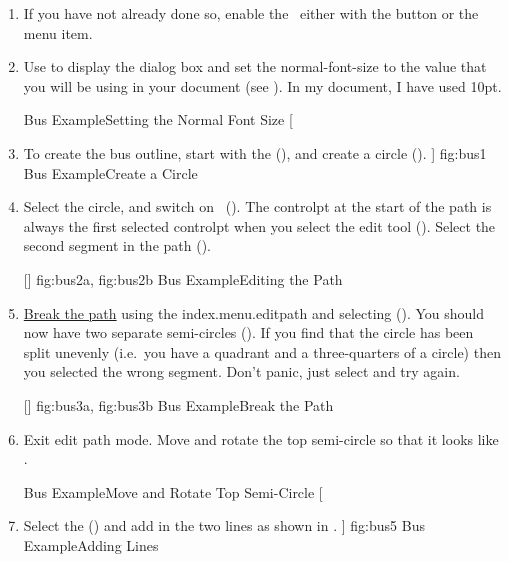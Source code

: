 \begin{enumerate}
\item If you have not already done so, enable the \gridlock\ either
with the  button or the
 menu item.

\item Use  to display the
 dialog box and set the
\gls{normal-font-size} to the value that you will be using in your
document (see ). In my document, I have
used 10pt.

{}
{Bus Example\dash Setting the Normal Font Size}
[
  \item To create the bus outline, start with the
   (), and create a circle
  ().
]
{fig:bus1}
{}
{Bus Example\dash Create a Circle}

\item Select the circle, and switch on \editpathmode\
().  The \gls{controlpt} at the start of
the \gls{path} is always the first selected \gls{controlpt} when you
select the edit tool (\figureref{fig:bus2a}). Select the second
segment in the path ().

[]
{
 {fig:bus2a}{}{},
 {fig:bus2b}{}{}
}
{Bus Example\dash Editing the Path}

\item \hyperref[mi:breakpath]{Break the path} using the
\gls{index.menu.editpath} and selecting 
 ().  You should now have two
separate semi-circles (\figureref{fig:bus3b}).  If you find
that the circle has been split unevenly (i.e.\ you have a quadrant
and a three-quarters of a circle) then you selected the wrong
segment. Don't panic, just select  and try
again.

[]
{
 {fig:bus3a}{}{},
 {fig:bus3b}{}{}
}
{Bus Example\dash Break the Path}

\item Exit edit path mode. Move and rotate the top semi-circle
so that it looks like .

{}
{Bus Example\dash Move and Rotate Top Semi-Circle}
[
  \item Select the  () and
  add in the two lines as shown in \figureref{fig:bus5}.
]
{fig:bus5}
{}
{Bus Example\dash Adding Lines}


\end{enumerate}
